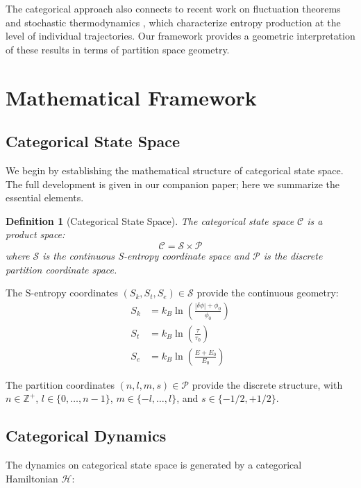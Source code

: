 \documentclass[twocolumn,10pt]{article}
\newtheorem{definition}[theorem]{Definition}
\begin{document}
The categorical approach also connects to recent work on fluctuation theorems \cite{jarzynski1997,crooks1999} and stochastic thermodynamics \cite{seifert2012}, which characterize entropy production at the level of individual trajectories. Our framework provides a geometric interpretation of these results in terms of partition space geometry.

\section{Mathematical Framework}

\subsection{Categorical State Space}

We begin by establishing the mathematical structure of categorical state space. The full development is given in our companion paper; here we summarize the essential elements.

\begin{definition}[Categorical State Space]
The categorical state space $\mathcal{C}$ is a product space:
\begin{equation}
    \mathcal{C} = \mathcal{S} \times \mathcal{P}
\end{equation}
where $\mathcal{S}$ is the continuous S-entropy coordinate space and $\mathcal{P}$ is the discrete partition coordinate space.
\end{definition}

The S-entropy coordinates $(S_k, S_t, S_e) \in \mathcal{S}$ provide the continuous geometry:
\begin{align}
    S_k &= k_B \ln\left(\frac{|\delta\phi| + \phi_0}{\phi_0}\right) \\
    S_t &= k_B \ln\left(\frac{\tau}{\tau_0}\right) \\
    S_e &= k_B \ln\left(\frac{E + E_0}{E_0}\right)
\end{align}

The partition coordinates $(n, l, m, s) \in \mathcal{P}$ provide the discrete structure, with $n \in \mathbb{Z}^+$, $l \in \{0, \ldots, n-1\}$, $m \in \{-l, \ldots, l\}$, and $s \in \{-1/2, +1/2\}$.

\subsection{Categorical Dynamics}

The dynamics on categorical state space is generated by a categorical Hamiltonian $\mathcal{H}$:
\end{document}
